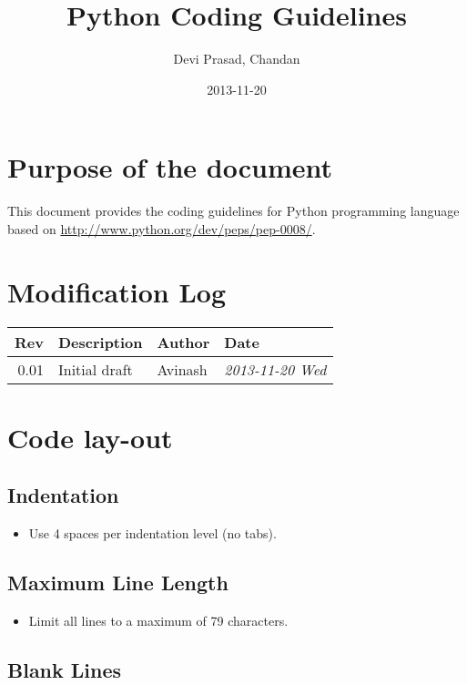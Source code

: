 \documentclass[11pt]{article}
\title{Python Coding Guidelines}
\author{Devi Prasad, Chandan}
\date{2013-11-20}
\begin{document}
\maketitle

\setcounter{tocdepth}{3}
\tableofcontents
\vspace*{1cm}

\section{Purpose of the document}
\label{sec-1}


  This document provides the coding guidelines for Python programming language based on \href{http://www.python.org/dev/peps/pep-0008/}{http://www.python.org/dev/peps/pep-0008/}.
\section{Modification Log}
\label{sec-2}


\begin{center}
\begin{tabular}{rlll}
\hline
  Rev  &  Description    &  Author   &  Date                     \\
\hline
 0.01  &  Initial draft  &  Avinash  &  \textit{2013-11-20 Wed}  \\
\hline
\end{tabular}
\end{center}
\section{Code lay-out}
\label{sec-3}
\subsection{Indentation}
\label{sec-3-1}

\begin{itemize}
\item Use 4 spaces per indentation level (no tabs).
\end{itemize}
\subsection{Maximum Line Length}
\label{sec-3-2}

\begin{itemize}
\item Limit all lines to a maximum of 79 characters.
\end{itemize}
\subsection{Blank Lines}
\label{sec-3-3}
\end{document}
